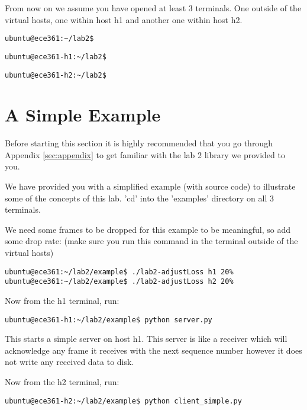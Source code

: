 \documentclass[11pt]{article}
\begin{document}
From now on we assume you have opened at least 3 terminals. One outside of the virtual hosts, one within host h1 and another one within host h2.

\begin{lstlisting}[style=ece361shell, caption={terminal outside of hosts}]
ubuntu@ece361:~/lab2$
\end{lstlisting}

\begin{lstlisting}[style=ece361shell, caption={h1 terminal}]
ubuntu@ece361-h1:~/lab2$
\end{lstlisting}

\begin{lstlisting}[style=ece361shell, caption={h2 terminal}]
ubuntu@ece361-h2:~/lab2$
\end{lstlisting}

\section{A Simple Example}
\label{sec:example}
Before starting this section it is highly recommended that you go through Appendix \ref{sec:appendix} to get familiar with the lab 2 library we provided to you.

We have provided you with a simplified example (with source code) to illustrate some of the concepts of this lab. 'cd' into the 'examples' directory on all 3 terminals.

We need some frames to be dropped for this example to be meaningful, so add some drop rate: (make sure you run this command in the terminal outside of the virtual hosts)
\begin{lstlisting}[style=ece361shell]
ubuntu@ece361:~/lab2/example$ ./lab2-adjustLoss h1 20%
ubuntu@ece361:~/lab2/example$ ./lab2-adjustLoss h2 20%
\end{lstlisting}

Now from the h1 terminal, run:
\begin{lstlisting}[style=ece361shell, caption={}]
ubuntu@ece361-h1:~/lab2/example$ python server.py
\end{lstlisting}

This starts a simple server on host h1. This server is like a receiver which will acknowledge any frame it receives with the next sequence number however it does not write any received data to disk.

Now from the h2 terminal, run:
\begin{lstlisting}[style=ece361shell, caption={}]
ubuntu@ece361-h2:~/lab2/example$ python client_simple.py
\end{lstlisting}
\end{document}
